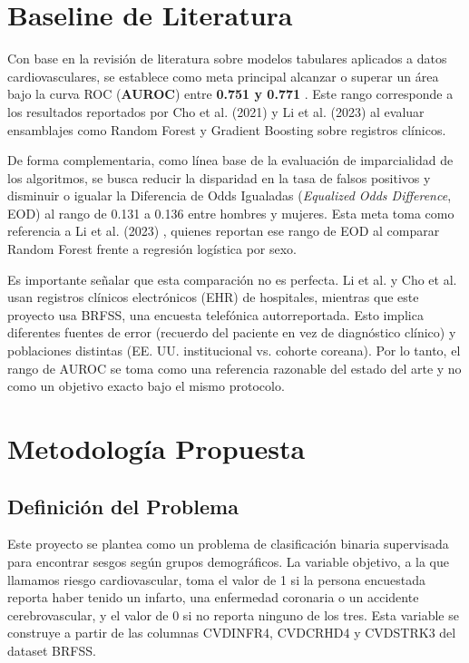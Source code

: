 \documentclass[conference]{IEEEtran}
\begin{document}
\section{Baseline de Literatura}

Con base en la revisión de literatura sobre modelos tabulares aplicados a datos cardiovasculares, se establece como meta principal alcanzar o superar un área bajo la curva ROC (\textbf{AUROC}) entre \textbf{0.751 y 0.771} \cite{li2023evaluating, cho2021preexisting}. Este rango corresponde a los resultados reportados por Cho et al. (2021) y Li et al. (2023) al evaluar ensamblajes como Random Forest y Gradient Boosting sobre registros clínicos.

De forma complementaria, como línea base de la evaluación de imparcialidad de los algoritmos, se busca reducir la disparidad en la tasa de falsos positivos y disminuir o igualar la Diferencia de Odds Igualadas (\textit{Equalized Odds Difference}, EOD) al rango de 0.131 a 0.136 entre hombres y mujeres. Esta meta toma como referencia a Li et al. (2023) \cite{li2023evaluating}, quienes reportan ese rango de EOD al comparar Random Forest frente a regresión logística por sexo.

Es importante señalar que esta comparación no es perfecta. Li et al. y Cho et al. usan registros clínicos electrónicos (EHR) de hospitales, mientras que este proyecto usa BRFSS, una encuesta telefónica autorreportada. Esto implica diferentes fuentes de error (recuerdo del paciente en vez de diagnóstico clínico) y poblaciones distintas (EE. UU. institucional vs. cohorte coreana). Por lo tanto, el rango de AUROC se toma como una referencia razonable del estado del arte y no como un objetivo exacto bajo el mismo protocolo.

\section{Metodología Propuesta}

\subsection{Definición del Problema}

Este proyecto se plantea como un problema de clasificación binaria supervisada para encontrar sesgos según grupos demográficos. La variable objetivo, a la que llamamos riesgo cardiovascular, toma el valor de 1 si la persona encuestada reporta haber tenido un infarto, una enfermedad coronaria o un accidente cerebrovascular, y el valor de 0 si no reporta ninguno de los tres. Esta variable se construye a partir de las columnas CVDINFR4, CVDCRHD4 y CVDSTRK3 del dataset BRFSS.
\end{document}
